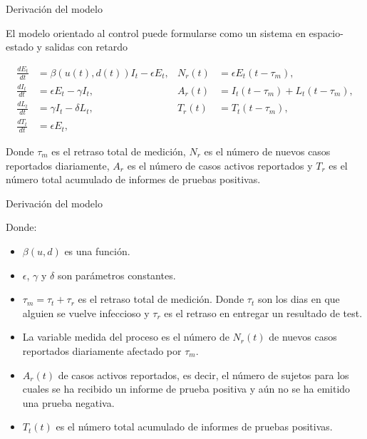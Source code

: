 \documentclass{beamer}
\begin{document}
\begin{frame}{Derivación del modelo}
\begin{justify}
\small
 El modelo orientado al control puede formularse como un sistema en espacio-estado y salidas con retardo

 \vspace{0.2cm}
{\footnotesize
\begin{align}
    \frac{dE_t}{dt} &= \beta(u(t), d(t))I_t - \epsilon E_t, & N_r(t) &= \epsilon E_t(t - \tau_m), \\[10pt]
    \frac{dI_t}{dt} &= \epsilon E_t - \gamma I_t, & A_r(t) &= I_t(t - \tau_m) + L_t(t - \tau_m), \\[10pt]
    \frac{dL_t}{dt} &= \gamma I_t - \delta L_t, & T_r(t) &= T_t(t - \tau_m), \\[10pt]
    \frac{dT_t}{dt} &= \epsilon E_t,
\end{align}

 \vspace{0.2cm}
Donde $\tau_m$ es el retraso total de medición, 
$N_r$ es el número de nuevos casos reportados diariamente, $A_r$ es el número de casos activos reportados y $T_r$ es el número total acumulado de informes de pruebas positivas.
}
\end{justify}
\end{frame}


\begin{frame}{Derivación del modelo}
\begin{justify}
{\footnotesize
Donde:
\begin{itemize}
\justifying
    \item $\beta(u, d)$ es una función.
    \vspace{0.3cm}
    \item $\epsilon$, $\gamma$ y $\delta$ son parámetros constantes.
    \vspace{0.3cm}
    \item $\tau_m=\tau_t+\tau_r$ es el retraso total de medición. Donde $\tau_t$ son los dias en que alguien se vuelve infeccioso y $\tau_r$ es el retraso en entregar un resultado de test.
    \vspace{0.3cm}
    \item La variable medida del proceso es el número de $N_r(t)$ de nuevos casos reportados diariamente afectado por $\tau_m$.
    \vspace{0.3cm}
    \item $A_r(t)$ de casos activos reportados, es decir, el número de sujetos para los cuales se ha recibido un informe de prueba positiva y aún no se ha emitido una prueba negativa.
    \vspace{0.3cm}
    \item $T_t(t)$ es el número total acumulado de informes de pruebas positivas. 
\end{itemize}
}

\end{justify}
\end{frame}
\end{document}
